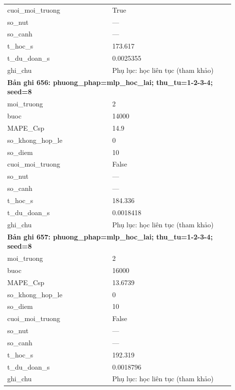 \begin{longtable}{p{0.43\linewidth}p{0.50\linewidth}}
cuoi\_\allowbreak moi\_\allowbreak truong & True \\
so\_\allowbreak nut & — \\
so\_\allowbreak canh & — \\
t\_\allowbreak hoc\_\allowbreak s & 173.617 \\
t\_\allowbreak du\_\allowbreak doan\_\allowbreak s & 0.0025355 \\
ghi\_\allowbreak chu & Phụ lục: học liên tục (tham khảo) \\
\midrule
\multicolumn{2}{p{0.95\linewidth}}{\textbf{Bản ghi 656: phuong\_phap=mlp\_hoc\_lai; thu\_tu=1-2-3-4; seed=8}} \\
moi\_\allowbreak truong & 2 \\
buoc & 14000 \\
MAPE\_\allowbreak Csp & 14.9 \\
so\_\allowbreak khong\_\allowbreak hop\_\allowbreak le & 0 \\
so\_\allowbreak diem & 10 \\
cuoi\_\allowbreak moi\_\allowbreak truong & False \\
so\_\allowbreak nut & — \\
so\_\allowbreak canh & — \\
t\_\allowbreak hoc\_\allowbreak s & 184.336 \\
t\_\allowbreak du\_\allowbreak doan\_\allowbreak s & 0.0018418 \\
ghi\_\allowbreak chu & Phụ lục: học liên tục (tham khảo) \\
\midrule
\multicolumn{2}{p{0.95\linewidth}}{\textbf{Bản ghi 657: phuong\_phap=mlp\_hoc\_lai; thu\_tu=1-2-3-4; seed=8}} \\
moi\_\allowbreak truong & 2 \\
buoc & 16000 \\
MAPE\_\allowbreak Csp & 13.6739 \\
so\_\allowbreak khong\_\allowbreak hop\_\allowbreak le & 0 \\
so\_\allowbreak diem & 10 \\
cuoi\_\allowbreak moi\_\allowbreak truong & False \\
so\_\allowbreak nut & — \\
so\_\allowbreak canh & — \\
t\_\allowbreak hoc\_\allowbreak s & 192.319 \\
t\_\allowbreak du\_\allowbreak doan\_\allowbreak s & 0.0018796 \\
ghi\_\allowbreak chu & Phụ lục: học liên tục (tham khảo) \\

\end{longtable}
